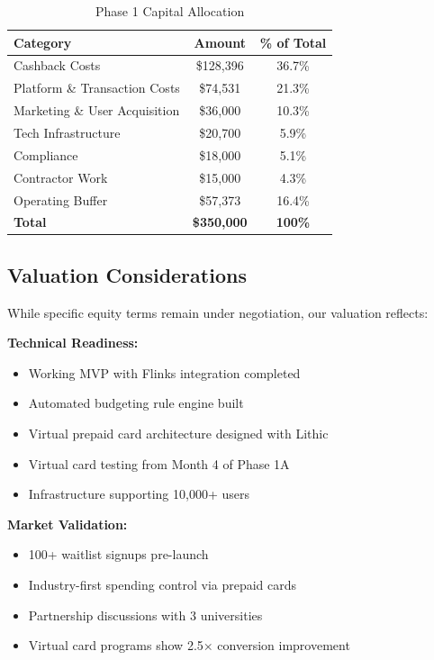 \documentclass[11pt,letterpaper]{article}
\begin{document}
\begin{table}[h]
\centering
\caption{Phase 1 Capital Allocation}
\begin{tabular}{|l|c|c|}
\hline
\textbf{Category} & \textbf{Amount} & \textbf{\% of Total} \\
\hline
Cashback Costs & \$128,396 & 36.7\% \\
Platform \& Transaction Costs & \$74,531 & 21.3\% \\
Marketing \& User Acquisition & \$36,000 & 10.3\% \\
Tech Infrastructure & \$20,700 & 5.9\% \\
Compliance & \$18,000 & 5.1\% \\
Contractor Work & \$15,000 & 4.3\% \\
Operating Buffer & \$57,373 & 16.4\% \\
\hline
\textbf{Total} & \textbf{\$350,000} & \textbf{100\%} \\
\hline
\end{tabular}
\end{table}

\subsection{Valuation Considerations}

While specific equity terms remain under negotiation, our valuation reflects:

\textbf{Technical Readiness:}
\begin{itemize}
\item Working MVP with Flinks integration completed
\item Automated budgeting rule engine built
\item Virtual prepaid card architecture designed with Lithic
\item Virtual card testing from Month 4 of Phase 1A
\item Infrastructure supporting 10,000+ users
\end{itemize}

\textbf{Market Validation:}
\begin{itemize}
\item 100+ waitlist signups pre-launch
\item Industry-first spending control via prepaid cards
\item Partnership discussions with 3 universities
\item Virtual card programs show 2.5× conversion improvement
\end{itemize}
\end{document}
